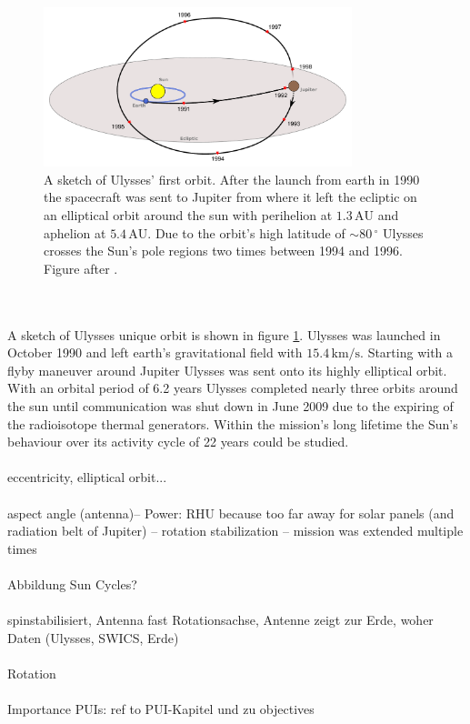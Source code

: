 \begin{figure}[h]
	\includegraphics[width=0.8\textwidth]{Figures/ulysses_trajectory.pdf}
	\centering
	\caption{A sketch of Ulysses' first orbit. After the launch from earth in 1990 the spacecraft was sent to Jupiter from where it left the ecliptic on an elliptical orbit around the sun with perihelion at $1.3\,\mathrm{AU}$ and aphelion at $5.4\,\mathrm{AU}$. Due to the orbit's high latitude of $\sim 80 \, ^\circ$ Ulysses crosses the Sun's pole regions two times between 1994 and 1996. Figure after \citet{esa_orbit}.}
	\label{fig:trajectory}
\end{figure}
\\ \\
A sketch of Ulysses unique orbit is shown in figure \ref{fig:trajectory}.
Ulysses was launched in October 1990 and left earth's gravitational field with $15.4\,\mathrm{km/s}$. Starting with a flyby maneuver around Jupiter Ulysses was sent onto its highly elliptical orbit.
With an orbital period of 6.2 years Ulysses completed nearly three orbits around the sun until communication was shut down in June 2009 due to the expiring of the radioisotope thermal generators.
Within the mission's long lifetime the Sun's behaviour over its activity cycle of 22 years could be studied. 
\\ \\
eccentricity, elliptical orbit...
\\ \\
aspect angle (antenna)-- Power: RHU because too far away for solar panels (and radiation belt of Jupiter) -- rotation stabilization --  mission was extended multiple times
\\ \\
Abbildung Sun Cycles?
\\ \\ 
spinstabilisiert, Antenna fast Rotationsachse, Antenne zeigt zur Erde, woher Daten (Ulysses, SWICS, Erde)
\\ \\
Rotation
\\ \\ 
Importance PUIs: ref to PUI-Kapitel und zu objectives
%
%
%
%
%
